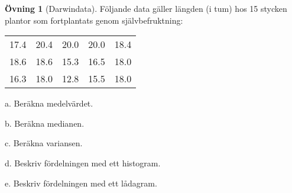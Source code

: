 \documentclass[
]{book}
\theoremstyle{definition}
\theoremstyle{definition}
\theoremstyle{definition}
\newtheorem{exercise}{Övning}[chapter]
\theoremstyle{definition}
\theoremstyle{remark}
\begin{document}
\begin{exercise}[Darwindata]
Följande data gäller längden (i tum) hos 15 stycken plantor som fortplantats genom självbefruktning:

\begin{table}
\centering
\begin{tabular}[t]{rrrrr}
\toprule
17.4 & 20.4 & 20.0 & 20.0 & 18.4\\
18.6 & 18.6 & 15.3 & 16.5 & 18.0\\
16.3 & 18.0 & 12.8 & 15.5 & 18.0\\
\bottomrule
\end{tabular}
\end{table}

a. Beräkna medelvärdet.

b. Beräkna medianen.

c. Beräkna variansen.

d. Beskriv fördelningen med ett histogram.

e. Beskriv fördelningen med ett lådagram.
\end{exercise}
\end{document}
